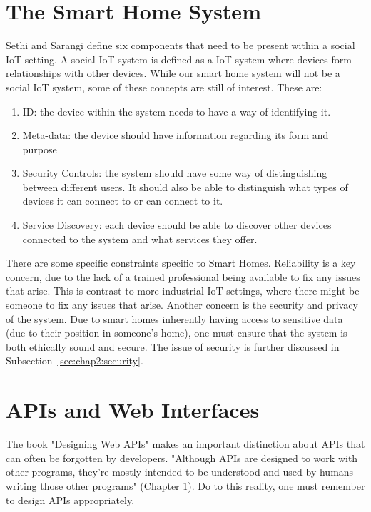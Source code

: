 \section{The Smart Home System} \label{sec:chap2:smarthome}
Sethi and Sarangi \cite{IoTArchitectures} define six components that need to be present within a social IoT setting. A social IoT system is defined as a IoT system where devices form relationships with other devices. While our smart home system will not be a social IoT system, some of these concepts are still of interest. These are: 
\begin{enumerate}
    \item ID: the device within the system needs to have a way of identifying 
        it.
    \item Meta-data: the device should have information regarding its form and 
        purpose
    \item Security Controls: the system should have some way of distinguishing 
        between different users. It should also be able to distinguish what 
        types of devices it can connect to or can connect to it.
    \item Service Discovery: each device should be able to discover other 
        devices connected to the system and what services they offer.
\end{enumerate}

There are some specific constraints specific to Smart Homes. Reliability is a key concern, due to the lack of a trained professional being available to fix any issues that arise. This is contrast to more industrial IoT settings, where there might be someone to fix any issues that arise. Another concern is the security and privacy of the system. Due to smart homes inherently having access to sensitive data (due to their position in someone's home), one must ensure that the system is both ethically sound and secure. The issue of security is further discussed in Subsection~\ref{sec:chap2:security}.

\section{APIs and Web Interfaces} \label{sec:chap2:API}
The book "Designing Web APIs" makes an important distinction about APIs that can often be forgotten by developers. "Although APIs are designed to work with other programs, they’re mostly intended to be understood and used by humans writing those other programs" \cite{DesigningWebApis} (Chapter 1). Do to this reality, one must remember to design APIs appropriately.  


